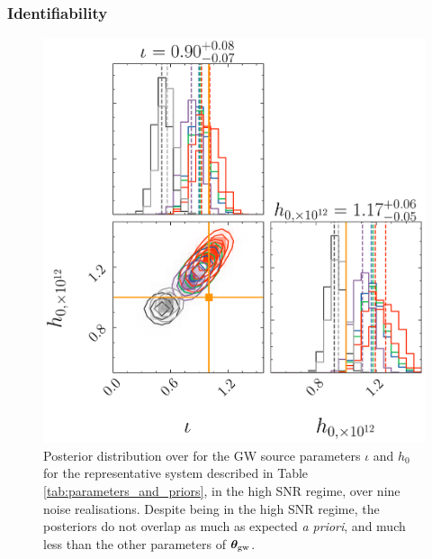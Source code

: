 \documentclass[fleqn,usenatbib,useAMS]{mnras}
\begin{document}
\subsubsection{Identifiability}
\begin{figure}
	\centering
	\includegraphics[width=\columnwidth]{images/stacked_GW_plot_iota_h}
	\caption{Posterior distribution over for the GW source parameters $\iota$ and $h_0$ for the representative system described in Table \ref{tab:parameters_and_priors}, in the high SNR regime, over nine noise realisations. Despite being in the high SNR regime, the posteriors do not overlap as much as expected \textit{a priori}, and much less than the other parameters of $\boldsymbol{\theta}_{\rm gw}$.}
	\label{fig:just_iota_h}
\end{figure}
\end{document}
